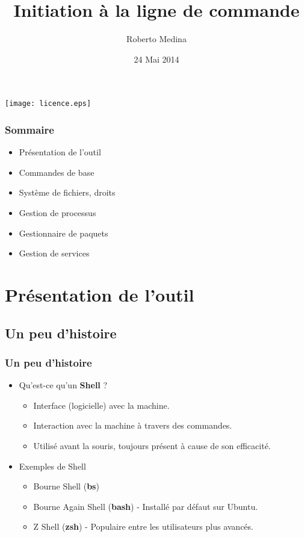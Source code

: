 \documentclass{beamer}
\title[Ubuntu Party - 14.04]{Initiation à la ligne de commande}
\author{Roberto Medina}
\institute{roberto@mambochimbo.com}
\date{24 Mai 2014}
\begin{document}
\begin{frame}[plain]
        \titlepage
        \center \texttt{[image: licence.eps]}
    \end{frame}
    
    \begin{frame}[plain]
        \frametitle{Sommaire}
        \begin{itemize}
            \item Présentation de l'outil
            \item Commandes de base
            \item Système de fichiers, droits
            \item Gestion de processus
            \item Gestionnaire de paquets
            \item Gestion de services
        \end{itemize}
    \end{frame}

    \section{Présentation de l'outil}
    \subsection{Un peu d'histoire}
    \begin{frame}
        \frametitle{Un peu d'histoire}
        \begin{itemize}
            \item Qu'est-ce qu'un {\bf Shell} ?
                \begin{itemize}
                    \item Interface (logicielle) avec la machine.
                    \item Interaction avec la machine à travers des commandes.
                    \item Utilisé avant la souris, toujours présent à cause de son efficacité.
                \end{itemize}
            \item Exemples de Shell
                \begin{itemize}
                    \item Bourne Shell ({\bf bs})
                    \item Bourne Again Shell ({\bf bash}) - Installé par défaut sur Ubuntu.
                    \item Z Shell ({\bf zsh}) - Populaire entre les utilisateurs plus avancés.
                \end{itemize}
        \end{itemize}
    \end{frame}
    
\end{document}
